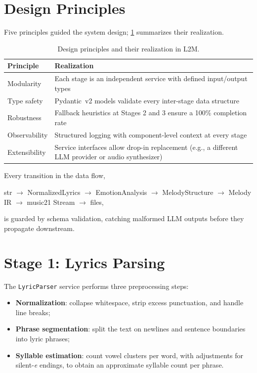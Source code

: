 \section{Design Principles}
\label{sec:mt-design}

Five principles guided the system design; \ref{tab:design-principles}
summarizes their realization.

\begin{table}[ht]
\centering
\caption[Design principles and their realization]{Design principles and
their realization in L2M.}
\label{tab:design-principles}
\begin{tabular}{p{3.2cm} p{8.9cm}}
\toprule
\textbf{Principle} & \textbf{Realization} \\
\midrule
Modularity & Each stage is an independent service with defined input/output
types \\
Type safety & Pydantic~v2 models validate every inter-stage data structure \\
Robustness & Fallback heuristics at Stages 2 and 3 ensure a 100\% completion
rate \\
Observability & Structured logging with component-level context at every
stage \\
Extensibility & Service interfaces allow drop-in replacement (e.g., a
different LLM provider or audio synthesizer) \\
\bottomrule
\end{tabular}
\end{table}

Every transition in the data flow,
\begin{center}
\ttfamily\small
str $\rightarrow$ NormalizedLyrics $\rightarrow$ EmotionAnalysis
$\rightarrow$ MelodyStructure $\rightarrow$ Melody IR $\rightarrow$
music21 Stream $\rightarrow$ files,
\end{center}
is guarded by schema validation, catching malformed LLM outputs before they
propagate downstream.

\section{Stage 1: Lyrics Parsing}
\label{sec:mt-stage1}

The \texttt{LyricParser} service performs three preprocessing steps:

\begin{itemize}
    \item \textbf{Normalization}: collapse whitespace, strip excess
    punctuation, and handle line breaks;
    \item \textbf{Phrase segmentation}: split the text on newlines and
    sentence boundaries into lyric phrases;
    \item \textbf{Syllable estimation}: count vowel clusters per word, with
    adjustments for silent-\emph{e} endings, to obtain an approximate
    syllable count per phrase.
\end{itemize}

